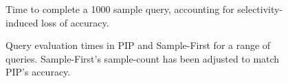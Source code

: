 

\begin{figure}
\begin{center}
\caption{Time to complete a 1000 sample query, accounting for selectivity-induced loss of accuracy.}
\label{fig:scaling_selectivity}
\end{center}
\end{figure}


\begin{figure}
\begin{center}
\caption{Query evaluation times in PIP and Sample-First for a range of queries.  Sample-First's sample-count has been adjusted to match PIP's accuracy.}
\label{fig:querytimings}
\end{center}
\end{figure}

